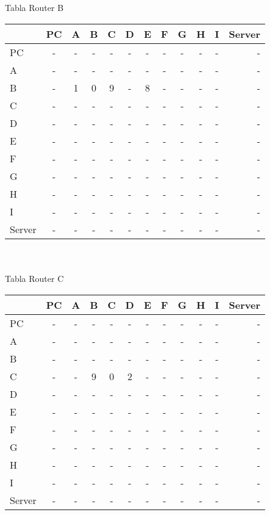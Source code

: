 \documentclass{article}
\begin{document}
\\
\\
Tabla Router B \\
\begin{tabular}{l*{10}{c}r}
              & PC & A & B & C & D & E & F & G & H & I & Server \\
\hline
PC             & - & - & - & - & - & - & - & - & - & - & -\\
A              & - & - & - & - & - & - & - & - & - & - & -\\
B              & - & 1 & 0 & 9 & - & 8 & - & - & - & - & -\\
C              & - & - & - & - & - & - & - & - & - & - & -\\
D              & - & - & - & - & - & - & - & - & - & - & -\\
E              & - & - & - & - & - & - & - & - & - & - & -\\
F              & - & - & - & - & - & - & - & - & - & - & -\\
G              & - & - & - & - & - & - & - & - & - & - & -\\
H              & - & - & - & - & - & - & - & - & - & - & -\\
I              & - & - & - & - & - & - & - & - & - & - & -\\
Server         & - & - & - & - & - & - & - & - & - & - & -\\

\end{tabular}
\\
\\
Tabla Router C \\
\begin{tabular}{l*{10}{c}r}
              & PC & A & B & C & D & E & F & G & H & I & Server \\
\hline
PC             & - & - & - & - & - & - & - & - & - & - & -\\
A              & - & - & - & - & - & - & - & - & - & - & -\\
B              & - & - & - & - & - & - & - & - & - & - & -\\
C              & - & - & 9 & 0 & 2 & - & - & - & - & - & -\\
D              & - & - & - & - & - & - & - & - & - & - & -\\
E              & - & - & - & - & - & - & - & - & - & - & -\\
F              & - & - & - & - & - & - & - & - & - & - & -\\
G              & - & - & - & - & - & - & - & - & - & - & -\\
H              & - & - & - & - & - & - & - & - & - & - & -\\
I              & - & - & - & - & - & - & - & - & - & - & -\\
Server         & - & - & - & - & - & - & - & - & - & - & -\\
\end{tabular}
\end{document}
